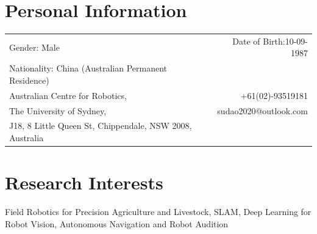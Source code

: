 \documentclass[margin,line]{res}
\begin{document}

\begin{resume}

\section{\sc Personal Information}
\vspace{.05in}
\begin{tabularx}{\textwidth}{X r}
Gender: Male & Date of Birth:10-09-1987 \\ 
Nationality: China (Australian Permanent Residence) \\
Australian Centre for Robotics,      &  +61(02)-93519181 \\            
The University of Sydney,   & sudao2020@outlook.com\\
J18, 8 Little Queen St, Chippendale, NSW 2008, Australia  & \\%
\end{tabularx}



\section{\sc Research Interests}
Field Robotics for Precision Agriculture and Livestock, SLAM, Deep Learning for Robot Vision, Autonomous Navigation and Robot Audition



\end{resume}
\end{document}
